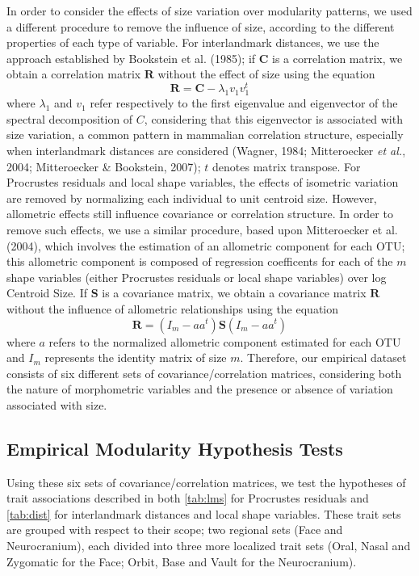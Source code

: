 \documentclass[11pt,twoside]{report}
\begin{document}
In order to consider the effects of size variation over modularity
patterns, we used a different procedure to remove the influence of size,
according to the different properties of each type of variable. For
interlandmark distances, we use the approach established by Bookstein et
al. (1985); if $\mathbf{C}$ is a correlation matrix, we obtain a
correlation matrix $\mathbf{R}$ without the effect of size using the
equation \[
\mathbf{R} = \mathbf{C} - \lambda_1 v_1 v^{t}_1
\] where $\lambda_1$ and $v_1$ refer respectively to the first
eigenvalue and eigenvector of the spectral decomposition of $C$,
considering that this eigenvector is associated with size variation, a
common pattern in mammalian correlation structure, especially when
interlandmark distances are considered (Wagner, 1984; Mitteroecker
\emph{et al.}, 2004; Mitteroecker \& Bookstein, 2007); $t$ denotes
matrix transpose. For Procrustes residuals and local shape variables,
the effects of isometric variation are removed by normalizing each
individual to unit centroid size. However, allometric effects still
influence covariance or correlation structure. In order to remove such
effects, we use a similar procedure, based upon Mitteroecker et al.
(2004), which involves the estimation of an allometric component for
each OTU; this allometric component is composed of regression
coefficents for each of the $m$ shape variables (either Procrustes
residuals or local shape variables) over log Centroid Size. If
$\mathbf{S}$ is a covariance matrix, we obtain a covariance matrix
$\mathbf{R}$ without the influence of allometric relationships using the
equation \[
\mathbf{R} = (I_m - aa^t) \mathbf{S} (I_m - aa^t)
\] where $a$ refers to the normalized allometric component estimated for
each OTU and $I_m$ represents the identity matrix of size $m$.
Therefore, our empirical dataset consists of six different sets of
covariance/correlation matrices, considering both the nature of
morphometric variables and the presence or absence of variation
associated with size.

\subsection{Empirical Modularity Hypothesis
Tests}\label{empirical-modularity-hypothesis-tests}

Using these six sets of covariance/correlation matrices, we test the
hypotheses of trait associations described in both \autoref{tab:lms} for
Procrustes residuals and \autoref{tab:dist} for interlandmark distances
and local shape variables. These trait sets are grouped with respect to
their scope; two regional sets (Face and Neurocranium), each divided
into three more localized trait sets (Oral, Nasal and Zygomatic for the
Face; Orbit, Base and Vault for the Neurocranium).
\end{document}
